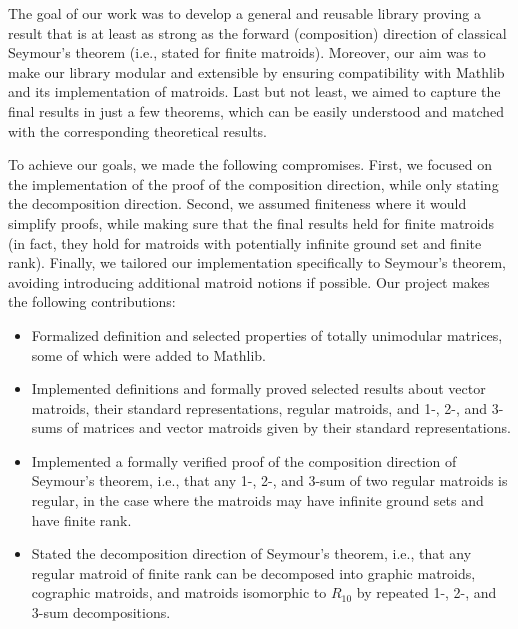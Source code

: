 The goal of our work was to develop a general and reusable library proving a result that is at least as strong as the forward (composition) direction of classical Seymour's theorem (i.e., stated for finite matroids). Moreover, our aim was to make our library modular and extensible by ensuring compatibility with Mathlib and its implementation of matroids. Last but not least, we aimed to capture the final results in just a few theorems, which can be easily understood and matched with the corresponding theoretical results.

To achieve our goals, we made the following compromises. First, we focused on the implementation of the proof of the composition direction, while only stating the decomposition direction. Second, we assumed finiteness where it would simplify proofs, while making sure that the final results held for finite matroids (in fact, they hold for matroids with potentially infinite ground set and finite rank). Finally, we tailored our implementation specifically to Seymour's theorem, avoiding introducing additional matroid notions if possible.
Our project makes the following contributions:
\begin{itemize}
    \item Formalized definition and selected properties of totally unimodular matrices, some of which were added to Mathlib.
    \item Implemented definitions and formally proved selected results about vector matroids, their standard representations, regular matroids, and 1-, 2-, and 3-sums of matrices and vector matroids given by their standard representations.
    \item Implemented a formally verified proof of the composition direction of Seymour's theorem, i.e., that any \hbox{1-,} 2-, and 3-sum of two regular matroids is regular, in the case where the matroids may have infinite ground sets and have finite rank.
    \item Stated the decomposition direction of Seymour's theorem, i.e., that any regular matroid of finite rank can be decomposed into graphic matroids, cographic matroids, and matroids isomorphic to $R_{10}$ by repeated 1-, 2-, and 3-sum decompositions. %
\end{itemize}

